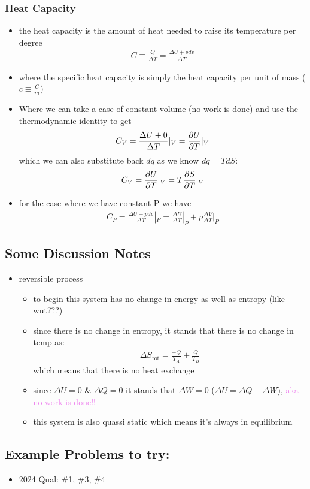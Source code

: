 \subsubsection{Heat Capacity}
\begin{itemize}
    \item the heat capacity is the amount of heat needed to raise its temperature per degree
    \begin{align}
        C \equiv \frac{Q}{\Delta T} = \frac{\Delta U + p dv}{\Delta T}
    \end{align}
    \item where the specific heat capacity is simply the heat capacity per unit of mass ($c \equiv \frac{C}{m}$)
    \item Where we can take a case of constant volume (no work is done) and use the thermodynamic
    identity to get
    \begin{align}
        C_V = \frac{\Delta U + 0}{\Delta T}|_V = \pdv{U}{T}|_V
    \end{align}
    which we can also substitute back $dq$ as we know $dq = T dS$:
    \begin{align}
        C_V = \pdv{U}{T}|_V = T \pdv{S}{T}|_V
    \end{align}
    \item for the case where we have constant P we have
    \begin{align}
        C_P = \frac{\Delta U + pdv}{\Delta T}|_P = \frac{\Delta U}{\Delta T}|_P + p \frac{\Delta V}{\Delta T}|_P
    \end{align}
\end{itemize}



\subsection{Some Discussion Notes}
\begin{itemize}
	\item reversible process
	      \begin{itemize}
		      \item to begin this system has no change in energy as well as entropy (like wut???)
		      \item since there is no change in entropy, it stands that there is no change in temp as:
		            \begin{align}
			            \Delta S_\text{tot} = \frac{-Q}{T_A} + \frac{Q}{T_B}
		            \end{align}
		            which means that there is no heat exchange
		      \item since $\Delta U = 0$ \& $\Delta Q = 0$ it stands that $\Delta W = 0$
		            ($\Delta U = \Delta Q - \Delta W$), \textcolor{violet}{aka no work is done!!}
		      \item this system is also quassi static which means it's always in equilibrium
	      \end{itemize}
\end{itemize}


\subsection{Example Problems to try:}
\begin{itemize}
    \item 2024 Qual: \#1, \#3, \#4
\end{itemize}
